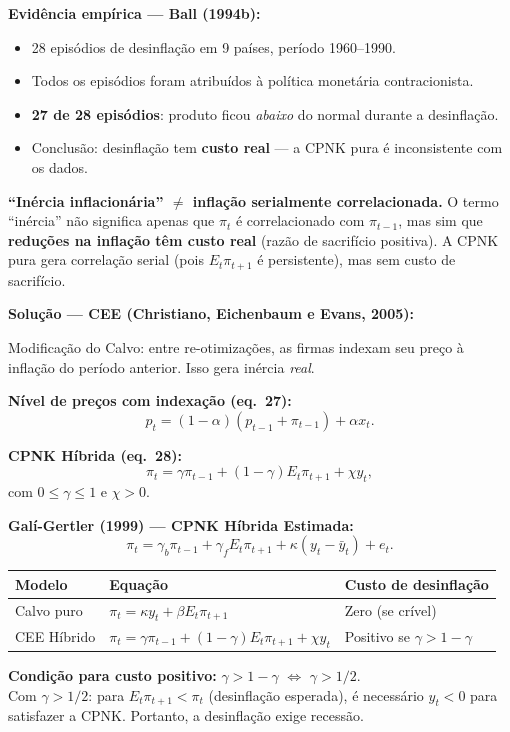 \documentclass[12pt, a4paper]{article}
\begin{document}
\textbf{Evidência empírica --- Ball (1994b):}
\begin{itemize}[leftmargin=1.5em, itemsep=2pt]
  \item 28 episódios de desinflação em 9 países, período 1960--1990.
  \item Todos os episódios foram atribuídos à política monetária contracionista.
  \item \textbf{27 de 28 episódios}: produto ficou \emph{abaixo} do normal durante a desinflação.
  \item Conclusão: desinflação tem \textbf{custo real} --- a CPNK pura é inconsistente com os dados.
\end{itemize}

\textbf{``Inércia inflacionária'' $\neq$ inflação serialmente correlacionada.}
O termo ``inércia'' não significa apenas que $\pi_t$ é correlacionado com $\pi_{t-1}$, mas sim que \textbf{reduções na inflação têm custo real} (razão de sacrifício positiva). A CPNK pura gera correlação serial (pois $E_t\pi_{t+1}$ é persistente), mas sem custo de sacrifício.

\textbf{Solução --- CEE (Christiano, Eichenbaum e Evans, 2005):}

Modificação do Calvo: entre re-otimizações, as firmas indexam seu preço à inflação do período anterior. Isso gera inércia \emph{real}.

\textbf{Nível de preços com indexação (eq.\ 27):}
\begin{equation}
p_t = (1-\alpha)(p_{t-1} + \pi_{t-1}) + \alpha x_t. \tag{eq.\ 27}
\end{equation}

\textbf{CPNK Híbrida (eq.\ 28):}
\begin{equation}
\boxed{\pi_t = \gamma\pi_{t-1} + (1-\gamma)E_t\pi_{t+1} + \chi y_t,} \tag{eq.\ 28}
\end{equation}
com $0 \leq \gamma \leq 1$ e $\chi > 0$.

\textbf{Galí-Gertler (1999) --- CPNK Híbrida Estimada:}
\begin{equation}
\pi_t = \gamma_b\pi_{t-1} + \gamma_f E_t\pi_{t+1} + \kappa(y_t - \bar{y}_t) + e_t. \tag{eq.\ 26}
\end{equation}

\begin{resultbox}[title={CPNK Híbrida CEE vs.\ Calvo Puro}]
\begin{center}
\begin{tabular}{lll}
\toprule
Modelo & Equação & Custo de desinflação \\
\midrule
Calvo puro & $\pi_t = \kappa y_t + \beta E_t\pi_{t+1}$ & Zero (se crível) \\
CEE Híbrido & $\pi_t = \gamma\pi_{t-1} + (1-\gamma)E_t\pi_{t+1} + \chi y_t$ & Positivo se $\gamma > 1-\gamma$ \\
\bottomrule
\end{tabular}
\end{center}
\textbf{Condição para custo positivo:} $\gamma > 1-\gamma$ $\Leftrightarrow$ $\gamma > 1/2$.\\
Com $\gamma > 1/2$: para $E_t\pi_{t+1} < \pi_t$ (desinflação esperada), é necessário $y_t < 0$ para satisfazer a CPNK. Portanto, a desinflação exige recessão.
\end{resultbox}
\end{document}
